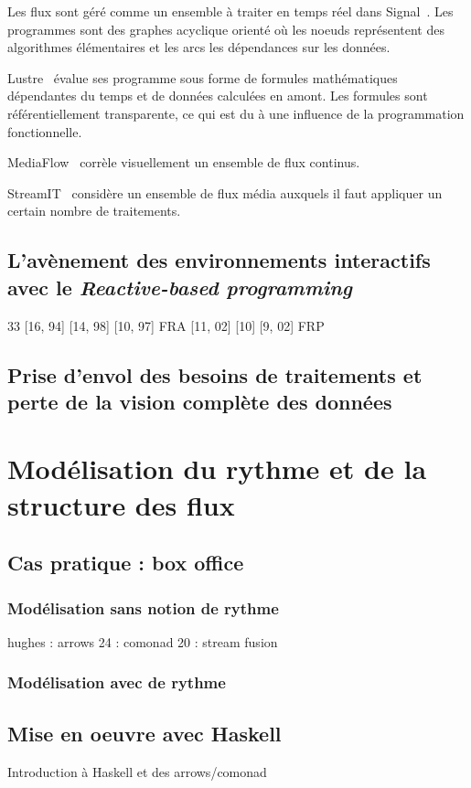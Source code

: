 \documentclass{llncs}
\newcommand{\RP}{\emph{Reactive-based programming} }
\begin{document}
Les flux sont géré comme un ensemble à traiter en temps réel dans Signal~\cite{Benveniste85}.
Les programmes sont des graphes acyclique orienté où les noeuds représentent des
algorithmes élémentaires et les arcs les dépendances sur les données.

Lustre~\cite{Caspi87} évalue ses programme sous forme de formules mathématiques
dépendantes du temps et de données calculées en amont.
Les formules sont référentiellement transparente, ce qui est du à une influence
de la programmation fonctionnelle.

MediaFlow~\cite{Elliott95} corrèle visuellement un ensemble de flux continus.

StreamIT~\cite{Thies02} considère un ensemble de flux média auxquels il faut
appliquer un certain nombre de traitements.

\subsection{L'avènement des environnements interactifs avec le \RP}
33
[16, 94] [14, 98] [10, 97] FRA
[11, 02] [10] [9, 02] FRP

\subsection{Prise d'envol des besoins de traitements et perte de la vision complète des données}

\section{Modélisation du rythme et de la structure des flux}
\subsection{Cas pratique : box office}
\subsubsection{Modélisation sans notion de rythme}
hughes : arrows
24 : comonad
20 : stream fusion

\subsubsection{Modélisation avec de rythme}
\subsection{Mise en oeuvre avec Haskell}
Introduction à Haskell et des arrows/comonad
\end{document}
